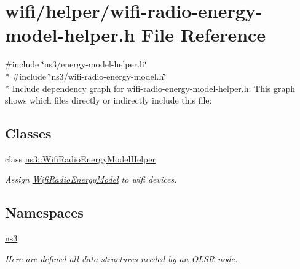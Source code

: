 \hypertarget{wifi-radio-energy-model-helper_8h}{}\section{wifi/helper/wifi-\/radio-\/energy-\/model-\/helper.h File Reference}
\label{wifi-radio-energy-model-helper_8h}
{\ttfamily \#include \char`\"{}ns3/energy-\/model-\/helper.\+h\char`\"{}}\\*
{\ttfamily \#include \char`\"{}ns3/wifi-\/radio-\/energy-\/model.\+h\char`\"{}}\\*
Include dependency graph for wifi-\/radio-\/energy-\/model-\/helper.h\+:
This graph shows which files directly or indirectly include this file\+:
\subsection*{Classes}
\begin{DoxyCompactItemize}
\item 
class \hyperlink{classns3_1_1WifiRadioEnergyModelHelper}{ns3\+::\+Wifi\+Radio\+Energy\+Model\+Helper}
\begin{DoxyCompactList}\small\item\em Assign \hyperlink{classns3_1_1WifiRadioEnergyModel}{Wifi\+Radio\+Energy\+Model} to wifi devices. \end{DoxyCompactList}\end{DoxyCompactItemize}
\subsection*{Namespaces}
\begin{DoxyCompactItemize}
\item 
 \hyperlink{namespacens3}{ns3}
\begin{DoxyCompactList}\small\item\em Here are defined all data structures needed by an O\+L\+SR node. \end{DoxyCompactList}\end{DoxyCompactItemize}
